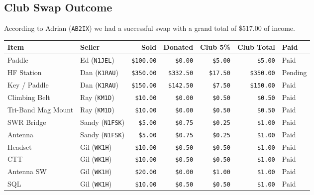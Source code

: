 \documentclass[10pt,letterpaper]{article}
\begin{document}
\subsection{Club Swap Outcome}
According to Adrian (\texttt{AB2IX}) we had a successful swap with a grand total of \$517.00 of income.\\
\noindent
\begin{tabular}{|l|l|r|r|r|r|l|}
\hline
\textbf{Item}      & \textbf{Seller}        & \textbf{Sold}     & \textbf{Donated}  & \textbf{Club 5\%} & \textbf{Club Total} & \textbf{Paid} \\ \hline \hline
Paddle             & Ed (\texttt{N1JEL})    & \texttt{\$100.00} & \texttt{\$0.00}   & \texttt{\$5.00}   & \texttt{\$5.00}     & Paid          \\ \hline
HF Station         & Dan (\texttt{K1RAU})   & \texttt{\$350.00} & \texttt{\$332.50} & \texttt{\$17.50}  & \texttt{\$350.00}   & Pending\textasteriskcentered{} \\ \hline
Key / Paddle       & Dan (\texttt{K1RAU})   & \texttt{\$150.00} & \texttt{\$142.50} & \texttt{\$7.50}   & \texttt{\$150.00}   & Paid          \\ \hline
Climbing Belt      & Ray (\texttt{KM1D})    & \texttt{\$10.00}  & \texttt{\$0.00}   & \texttt{\$0.50}   & \texttt{\$0.50}     & Paid          \\ \hline
Tri-Band Mag Mount & Ray (\texttt{KM1D})    & \texttt{\$10.00}  & \texttt{\$0.00}   & \texttt{\$0.50}   & \texttt{\$0.50}     & Paid          \\ \hline
SWR Bridge         & Sandy (\texttt{N1FSK}) & \texttt{\$5.00}   & \texttt{\$0.75}   & \texttt{\$0.25}   & \texttt{\$1.00}     & Paid          \\ \hline
Antenna            & Sandy (\texttt{N1FSK}) & \texttt{\$5.00}   & \texttt{\$0.75}   & \texttt{\$0.25}   & \texttt{\$1.00}     & Paid          \\ \hline
Headset            & Gil (\texttt{WK1H})    & \texttt{\$10.00}  & \texttt{\$0.50}   & \texttt{\$0.50}   & \texttt{\$1.00}     & Paid          \\ \hline
CTT                & Gil (\texttt{WK1H})    & \texttt{\$10.00}  & \texttt{\$0.50}   & \texttt{\$0.50}   & \texttt{\$1.00}     & Paid          \\ \hline
Antenna SW         & Gil (\texttt{WK1H})    & \texttt{\$20.00}  & \texttt{\$0.00}   & \texttt{\$1.00}   & \texttt{\$1.00}     & Paid          \\ \hline
SQL                & Gil (\texttt{WK1H})    & \texttt{\$10.00}  & \texttt{\$0.50}   & \texttt{\$0.50}   & \texttt{\$1.00}     & Paid          \\ \hline

\end{tabular}
\end{document}
